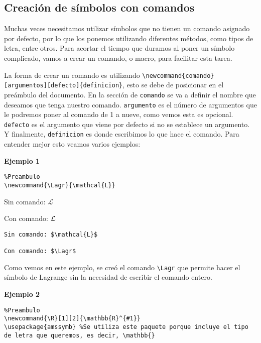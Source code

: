 \subsection{Creación de símbolos con comandos}

Muchas veces necesitamos utilizar símbolos que no tienen un comando asignado por defecto, por lo que los ponemos utilizando diferentes métodos, como tipos de letra, entre otros. Para acortar el tiempo que duramos al poner un símbolo complicado, vamos a crear un comando, o macro, para facilitar esta tarea.

La forma de crear un comando es utilizando \verb|\newcommand{comando}[argumentos][defecto]{definicion}|, esto se debe de posicionar en el preámbulo del documento. En la sección de \verb|comando| se va a definir el nombre que deseamos que tenga nuestro comando. \verb|argumento| es el número de argumentos que le podremos poner al comando de 1 a nueve, como vemos esta es opcional. \verb|defecto| es el argumento que viene por defecto si no se establece un argumento. Y finalmente, \verb|definicion| es donde escribimos lo que hace el comando. Para entender mejor esto veamos varios ejemplos: 

\textbf{Ejemplo 1}

\begin{myquote}
	\begin{lstlisting}
%Preambulo
\newcommand{\Lagr}{\mathcal{L}}		
	\end{lstlisting}
\end{myquote}

Sin comando: $\mathcal{L}$

Con comando: $\Lagr$

\begin{myquote}
	\begin{lstlisting}
Sin comando: $\mathcal{L}$
		
Con comando: $\Lagr$
	\end{lstlisting}
\end{myquote} 

Como vemos en este ejemplo, se creó el comando \verb|\Lagr| que permite hacer el símbolo de Lagrange sin la necesidad de escribir el comando entero.

\textbf{Ejemplo 2}

\begin{myquote}
	\begin{lstlisting}
%Preambulo
\newcommand{\R}[1][2]{\mathbb{R}^{#1}}
\usepackage{amssymb} %Se utiliza este paquete porque incluye el tipo de letra que queremos, es decir, \mathbb{}
	\end{lstlisting}
\end{myquote}

